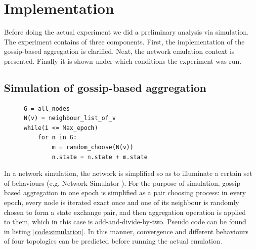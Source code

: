 \section{Implementation}
\label{sec:implementation}
Before doing the actual experiment we did a preliminary analysis via simulation. The experiment contains of three components. First, the implementation of the gossip-based aggregation is clarified. Next, the network emulation context is presented. Finally it is shown under which conditions the experiment was run.

\subsection{Simulation of gossip-based aggregation}
\begin{figure}[!h]
\begin{lstlisting}[caption={Pseudo Code for gossip-based aggregation simulation}, label=code:simulation, mathescape=true, captionpos=b]
G = all_nodes
N(v) = neighbour_list_of_v
while(i <= Max_epoch)
	for n in G:
		m = random_choose(N(v))
		n.state = n.state + m.state
\end{lstlisting}
\end{figure}
\label{sec:simulation}
In a network simulation, the network is simplified so as to illuminate a certain set of behaviours (e.g. Network Simulator \cite{ns}). For the purpose of simulation, gossip-based aggregation in one epoch is simplified as a pair choosing process: in every epoch, every node is iterated exact once and one of its neighbour is randomly chosen to form a state exchange pair, and then aggregation operation is applied to them, which in this case is add-and-divide-by-two. Pseudo code can be found in listing \ref{code:simulation}. In this manner, convergence and different behaviours of four topologies can be predicted before running the actual emulation.

